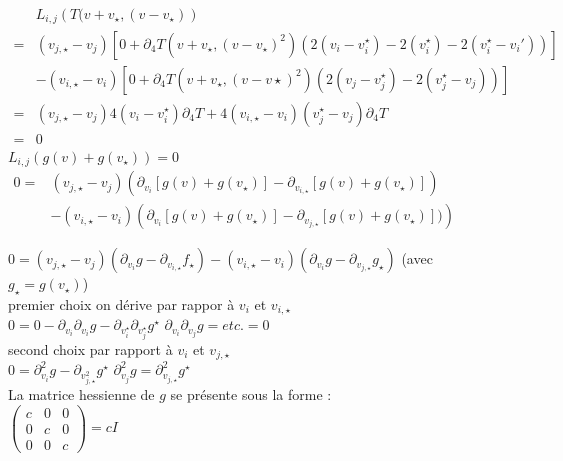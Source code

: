 \documentclass[12pt,a4paper]{article}
\begin{document}
\begin{dem}
\begin{minipage}[t]{18cm}
\begin{dem}
\begin{minipage}[t]{17.5cm}
			$\begin{aligned}
				&L_{i,j}\left(T(v+v_\star,(v-v_\star)\right)\\
				=&(v_{j,\star}-v_j)\left[0+\partial_4T(v+v_\star,(v-v_\star)^2)\left(2(v_i-v_i^\star)-2(v_i^\star)-2(v_i^\star-v_i')\right)\right]\\
				&-(v_{i,\star}-v_i)\left[0+\partial_4 T(v+v_\star,(v-v\star)^2)\left(2(v_j-v_j^\star)-2(v_j^\star-v_j)\right)\right]\\
				=& (v_{j,\star}-v_j)4(v_i-v_i^\star)\partial_4 T + 4(v_{i,\star}-v_i)(v_j^\star-v_j)\partial_4 T\\
				=&0
			\end{aligned}$\\
			
			$L_{i,j}(g(v)+g(v_\star)) = 0$\\
			$\begin{aligned}
				0=&(v_{j,\star}-v_j)\left(\partial_{v_i}[g(v)+g(v_\star)]-\partial_{v_{i,\star}}[g(v)+g(v_\star)]\right) \\
				&- (v_{i,\star}-v_i)\left(\partial_{v_i}[g(v)+g(v_\star)]-\partial_{v_{j,\star}}[g(v)+g(v_\star)])\right)
			\end{aligned}$
			
			\vspace{.5cm}
			
			$0=(v_{j,\star}-v_j)\left(\partial_{v_i}g-\partial_{v_{i,\star}}f_\star\right) - (v_{i,\star}-v_i)\left(\partial_{v_i}g-\partial_{v_{j,\star}}g_\star\right)$ \hspace{.5cm} (avec $g_\star = g(v_\star)$)\\			
			premier choix on dérive par rappor à $v_i$ et $v_{i,\star}$ \\
			$0= 0-\partial_{v_i}\partial_{v_i}g-\partial_{v_i^\star}\partial_{v_j^\star} g^\star$ \hspace{.5cm} $\partial_{v_i}\partial_{v_j} g = etc. = 0$\\
			second choix par rapport à $v_i$ et $v_{j,\star}$\\
			$0=\partial_{v_i}^2 g - \partial_{v_{j,\star}^2} g^\star$ \hspace{.5cm} $\partial_{v_j}^2 g = \partial_{v_{j,\star}}^2 g^\star$\\
			La matrice hessienne de $g$ se présente sous la forme :\\
			\hspace*{1cm} $\begin{pmatrix}
			c & 0 & 0 \\
			0 & c & 0 \\
			0 & 0 & c
			\end{pmatrix} = c I$\\
			

\end{minipage}
\end{dem}
\end{minipage}
\end{dem}
\end{document}
